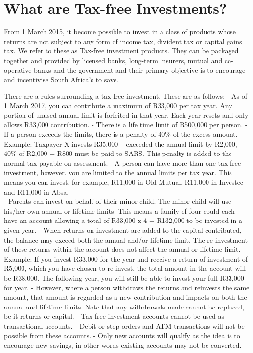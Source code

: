\documentclass[11pt]{article}
\begin{document}
    \hypertarget{what-are-tax-free-investments}{%
\section{What are Tax-free
Investments?}\label{what-are-tax-free-investments}}

    From 1 March 2015, it become possible to invest in a class of products
whose returns are not subject to any form of income tax, divident tax or
capital gains tax. We refer to these as Tax-free investment products.
They can be packaged together and provided by licensed banks, long-term
insurers, mutual and co-operative banks and the government and their
primary objective is to encourage and incentivise South Africa's to
save.

There are a rules surrounding a tax-free investment. These are as
follows: - As of 1 March 2017, you can contribute a maximum of R33,000
per tax year. Any portion of unused annual limit is forfeited in that
year. Each year resets and only allows R33,000 contribution. - There is
a life time limit of R500,000 per person. - If a person exceeds the
limits, there is a penalty of 40\% of the excess amount. Example:
Taxpayer X invests R35,000 -- exceeded the annual limit by R2,000, 40\%
of R2,000 = R800 must be paid to SARS. This penalty is added to the
normal tax payable on assessment. - A person can have more than one tax
free investment, however, you are limited to the annual limits per tax
year. This means you can invest, for example, R11,000 in Old Mutual,
R11,000 in Investec and R11,000 in Absa.\\
- Parents can invest on behalf of their minor child. The minor child
will use his/her own annual or lifetime limits. This means a family of
four could each have an account allowing a total of R33,000 x 4 =
R132,000 to be invested in a given year. - When returns on investment
are added to the capital contributed, the balance may exceed both the
annual and/or lifetime limit. The re-investment of these returns within
the account does not affect the annual or lifetime limit. Example: If
you invest R33,000 for the year and receive a return of investment of
R5,000, which you have chosen to re-invest, the total amount in the
account will be R38,000. The following year, you will still be able to
invest your full R33,000 for year. - However, where a person withdraws
the returns and reinvests the same amount, that amount is regarded as a
new contribution and impacts on both the annual and lifetime limits.
Note that any withdrawals made cannot be replaced, be it returns or
capital. - Tax free investment accounts cannot be used as transactional
accounts. - Debit or stop orders and ATM transactions will not be
possible from these accounts. - Only new accounts will qualify as the
idea is to encourage new savings, in other words existing accounts may
not be converted.
\end{document}
